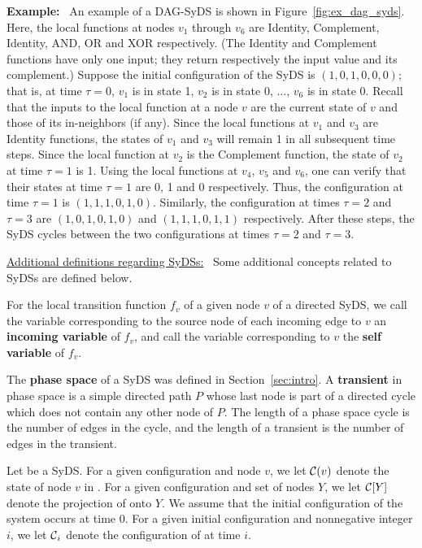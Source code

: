 \noindent
\textbf{Example:}~ An example of a DAG-SyDS is shown in
Figure~\ref{fig:ex_dag_syds}.
Here, the local functions at nodes $v_1$ through
$v_6$ are Identity, Complement, Identity, AND, OR and
XOR respectively.
(The Identity and Complement functions have only one input;
they return respectively the input value and its complement.) 
Suppose the initial configuration of the SyDS is $(1, 0, 1, 0, 0, 0)$;
that is, at time $\tau = 0$, $v_1$ is in state 1, 
$v_2$ is in state 0, $\ldots$, $v_6$ is in state 0.
Recall that the inputs to the local function at a node $v$ are the current
state of $v$ and those of its in-neighbors (if any).
Since the local functions at $v_1$ and $v_3$ are Identity functions,
the states of $v_1$ and $v_3$ will remain 1 in all subsequent time steps.
Since the local function at $v_2$ is the Complement function, the state of
$v_2$ at time $\tau = 1$ is 1.
Using the local functions at $v_4$, $v_5$ and $v_6$, one can verify that
their states at time $\tau = 1$ are 0, 1 and 0 respectively.
Thus, the configuration at time $\tau = 1$ is 
$(1, 1, 1, 0, 1, 0)$.
Similarly, the configuration at times $\tau = 2$ and
$\tau = 3$ are  $(1, 0, 1, 0, 1, 0)$ and $(1, 1, 1, 0, 1, 1)$
respectively.
After these steps, the SyDS cycles between the two configurations
at times $\tau =2$ and $\tau = 3$.

\smallskip
\noindent
\underline{\textsf{Additional definitions regarding SyDSs:}}~
Some additional concepts
related to SyDSs are defined below.

\begin{definition}\label{def:variable_typesl}
For the local transition function $f_v$ of a given node $v$ of a directed  SyDS,
we call the variable corresponding to the source node 
of each incoming edge to $v$ an {\bf incoming variable} of $f_v$,
and call the variable corresponding to $v$ the  {\bf self variable} of $f_v$.
\end{definition}

The \textbf{phase space} of a SyDS was defined in Section~\ref{sec:intro}.
A \textbf{transient} in phase space is a simple directed path $P$ whose
last node is part of a directed cycle which does not 
contain any other node of $P$.
The length of a phase space cycle is the number of edges in the cycle,
and the length of a transient is the number of edges in the transient.

Let \cals{} be a SyDS.
For a given configuration \calc{} and node $v$,
we let $\mbox{$\mathcal{C}$}(v)$ denote the state of node $v$ in \calc{}.
For a given configuration \calc{} and set of nodes $Y$,
we let $\mbox{$\mathcal{C}$}[Y]$ denote the projection of \calc{} onto $Y$.
We assume that the initial configuration of the system 
occurs at time 0.
For a given initial configuration \calc{} and nonnegative integer $i$,
we let $\mbox{$\mathcal{C}$}_i$ denote the configuration of \cals{} at time $i$.

